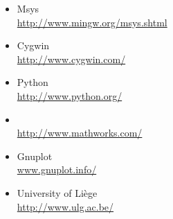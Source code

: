 \begin{itemize}
\item[]Msys\\
\url{http://www.mingw.org/msys.shtml}

\item[\raisebox{-5mm}{\texttt{[image: Cygwin-logo]}}] \begin{minipage}{12cm}
Cygwin\\
\url{http://www.cygwin.com/}
\end{minipage}

\item[\raisebox{-4mm}{\texttt{[image: pythonlogo]}}] \begin{minipage}{12cm}
Python\\
\url{http://www.python.org/}
\end{minipage}

\item[\raisebox{-4mm}{\texttt{[image: Matlab\_Logo]}}] \begin{minipage}{12cm}
\matlab\\
\url{http://www.mathworks.com/}
\end{minipage}

\item[]Gnuplot\\
\url{www.gnuplot.info/}

\item[\raisebox{-4mm}{\texttt{[image: ulglogonew]}}] \begin{minipage}{12cm}
University of Liège\\
\url{http://www.ulg.ac.be/}
\end{minipage}


\end{itemize}
